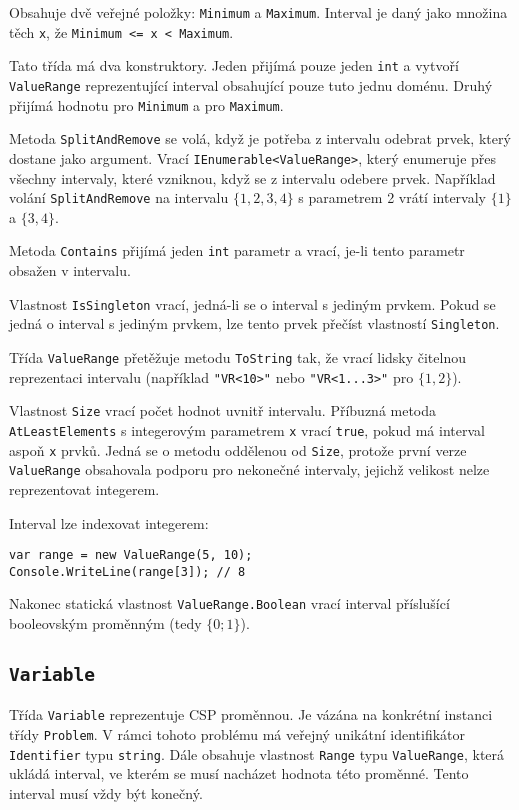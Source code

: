 \documentclass[a4paper]{article}
\begin{document}
Obsahuje dvě veřejné položky: \texttt{Minimum} a \texttt{Maximum}. Interval
je daný jako množina těch \texttt{x}, že \texttt{Minimum <= x < Maximum}.

Tato třída má dva konstruktory. Jeden přijímá pouze jeden \texttt{int} a vytvoří
\texttt{ValueRange} reprezentující interval obsahující pouze tuto jednu doménu.
Druhý přijímá hodnotu pro \texttt{Minimum} a pro \texttt{Maximum}.

Metoda \texttt{SplitAndRemove} se volá, když je potřeba z intervalu odebrat
prvek, který dostane jako argument. Vrací \texttt{IEnumerable<ValueRange>},
který enumeruje přes všechny
intervaly, které vzniknou, když se z intervalu odebere prvek. Například volání
\texttt{SplitAndRemove} na intervalu $\{1,2,3,4\}$ s parametrem 2 vrátí
intervaly $\{1\}$ a $\{3,4\}$.

Metoda \texttt{Contains} přijímá jeden \texttt{int} parametr a vrací, je-li
tento parametr obsažen v intervalu.

Vlastnost \texttt{IsSingleton} vrací, jedná-li se o interval s jediným prvkem.
Pokud se jedná o interval s jediným prvkem, lze tento prvek přečíst vlastností
\texttt{Singleton}.

Třída \texttt{ValueRange} přetěžuje metodu \texttt{ToString} tak, že vrací
lidsky čitelnou reprezentaci intervalu (například \texttt{"VR<10>"} nebo
\texttt{"VR<1...3>"} pro $\{1,2\}$).

Vlastnost \texttt{Size} vrací počet hodnot uvnitř intervalu.
Příbuzná metoda \texttt{AtLeastElements} s integerovým parametrem \texttt{x} vrací
\texttt{true}, pokud má interval aspoň \texttt{x} prvků. Jedná se o metodu
oddělenou od \texttt{Size}, protože první verze \texttt{ValueRange} obsahovala
podporu pro nekonečné intervaly, jejichž velikost nelze reprezentovat integerem.

Interval lze indexovat integerem:
\begin{lstlisting}
var range = new ValueRange(5, 10);
Console.WriteLine(range[3]); // 8
\end{lstlisting}

Nakonec statická vlastnost \texttt{ValueRange.Boolean} vrací interval příslušící
booleovským proměnným (tedy $\{0;1\}$).

\subsection{\texttt{Variable}}
Třída \texttt{Variable} reprezentuje CSP proměnnou. Je vázána na konkrétní
instanci třídy \texttt{Problem}. V rámci tohoto problému má veřejný unikátní
identifikátor \texttt{Identifier} typu \texttt{string}. Dále obsahuje vlastnost
\texttt{Range} typu \texttt{ValueRange}, která ukládá interval, ve kterém se
musí nacházet hodnota této proměnné. Tento interval musí vždy být konečný.
\end{document}
